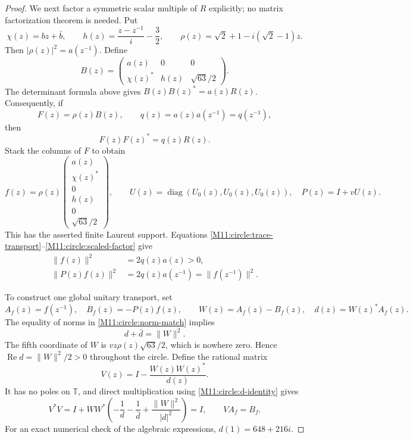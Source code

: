 \documentclass[11pt,a4paper,oneside]{report}
\theoremstyle{definition}
\theoremstyle{remark}
\DeclareMathOperator{\diag}{diag}
\newcommand{\T}{\mathbb T}
\begin{document}
\begin{proof}
We next factor a symmetric scalar multiple of $R$ explicitly;
no matrix factorization theorem is needed. Put
\[
\chi(z)=bz+\bar b,\qquad
h(z)=\frac{z-z^{-1}}{i}-\frac32,\qquad
\rho(z)=\sqrt2+1-i(\sqrt2-1)z.
\]
Then $|\rho(z)|^2=a(z^{-1})$. Define
\begin{equation}\label{M11:circle:polynomial-factor}
B(z)=\begin{pmatrix}
a(z)&0&0\\
\chi(z)^*&h(z)&\sqrt{63}/2
\end{pmatrix}.
\end{equation}
The determinant formula above gives
$B(z)B(z)^*=a(z)R(z)$. Consequently, if
\[
F(z)=\rho(z)B(z),\qquad q(z)=a(z)a(z^{-1})=q(z^{-1}),
\]
then
\begin{equation}\label{M11:circle:scaled-factor}
F(z)F(z)^*=q(z)R(z).
\end{equation}
Stack the columns of $F$ to obtain
\begin{equation}\label{M11:circle:finite-vector}
f(z)=\rho(z)
\begin{pmatrix}
a(z)\\ \chi(z)^*\\0\\h(z)\\0\\\sqrt{63}/2
\end{pmatrix},
\qquad
U(z)=\diag(U_0(z),U_0(z),U_0(z)),\quad P(z)=I+vU(z).
\end{equation}
This has the asserted finite Laurent support. Equations
\eqref{M11:circle:trace-transport}--\eqref{M11:circle:scaled-factor} give
\begin{align}
\|f(z)\|^2&=2q(z)a(z)>0,\label{M11:circle:nonzero}\\
\|P(z)f(z)\|^2&=2q(z)a(z^{-1})
=\|f(z^{-1})\|^2.\label{M11:circle:norm-match}
\end{align}

To construct one global unitary transport, set
\[
A_f(z)=f(z^{-1}),\quad B_f(z)=-P(z)f(z),\qquad
W(z)=A_f(z)-B_f(z),\quad d(z)=W(z)^*A_f(z).
\]
The equality of norms in \eqref{M11:circle:norm-match} implies
\begin{equation}\label{M11:circle:d-identity}
d+\bar d=\|W\|^2.
\end{equation}
The fifth coordinate of $W$ is
$vz\rho(z)\sqrt{63}/2$, which is nowhere zero. Hence
$\operatorname{Re}d=\|W\|^2/2>0$ throughout the circle.
Define the rational matrix
\begin{equation}\label{M11:circle:unitary-transport}
V(z)=I-\frac{W(z)W(z)^*}{d(z)}.
\end{equation}
It has no poles on $\T$, and direct multiplication using
\eqref{M11:circle:d-identity} gives
\[
V^*V=I+WW^*
\left(-\frac1d-\frac1{\bar d}+
\frac{\|W\|^2}{|d|^2}\right)=I,
\qquad VA_f=B_f.
\]
For an exact numerical check of the algebraic expressions,
$d(1)=648+216i$.


\end{proof}
\end{document}
